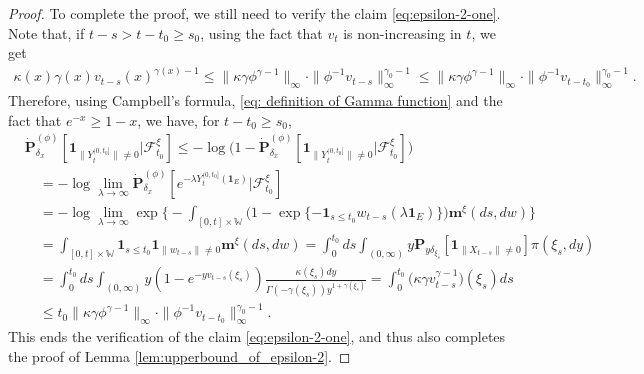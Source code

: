 \documentclass[12pt,a4paper]{amsart}
\theoremstyle{definition}
\numberwithin{equation}{section}
\begin{document}
\begin{proof}
To complete the proof, we still need to verify the claim \eqref{eq:epsilon-2-one}.
Note that, if $t-s > t-t_0 \geq s_0$, using the fact that $v_t$ is non-increasing in $t$, we get
\begin{align}
	\kappa(x)\gamma(x) v_{t-s}(x)^{\gamma(x)-1}
	\leq \|\kappa \gamma \phi^{\gamma - 1}\|_\infty \cdot \|\phi^{-1} v_{t-s}\|^{\gamma_0-1}_\infty
	\leq \|\kappa\gamma\phi^{\gamma - 1}\|_\infty \cdot \|\phi^{-1}v_{t-t_0}\|^{\gamma_0-1}_\infty.
\end{align}
Therefore, using Campbell's formula, \eqref{eq: definition of Gamma function} and the fact that $e^{-x} \geq 1-x$, we have,  for $t-t_0 \geq s_0$,
\begin{align}
	&\dot{\mathbf P}_{\delta_x}^{(\phi)}[\mathbf 1_{\| Y_t^{(0,t_0]}\|\neq 0}|\mathscr F^\xi_{t_0}]
   \leq - \log \big( 1- \dot{\mathbf P}_{\delta_x}^{(\phi)}[\mathbf 1_{ \| Y_t^{(0,t_0]}\|\neq 0}|\mathscr F^\xi_{t_0}]\big)
	\\&\quad =  - \log \lim_{\lambda \to \infty}\dot{\mathbf P}_{\delta_x}^{(\phi)}[e^{- \lambda Y_t^{(0,t_0]}(\mathbf 1_E) }|\mathscr F^\xi_{t_0}]
	\\&\quad = -\log \lim_{\lambda \to \infty} \exp\Big\{- \int_{[0,t]\times \mathbb W} \big( 1-\exp\{- \mathbf 1_{s\leq t_0} w_{t-s}(\lambda \mathbf 1_E)\}  \big) \mathbf m^\xi(ds,dw)\Big\}
	\\&\quad = \int_{[0,t]\times \mathbb W}\mathbf 1_{s\leq t_0} \mathbf 1_{ \|w_{t-s}\| \neq 0} \mathbf m^\xi(ds,dw)
	= \int_0^{t_0} ds \int_{(0,\infty)} y\mathbf P_{y\delta_{\xi_s}}[\mathbf 1_{ \|X_{t-s}\| \neq 0}]\pi(\xi_s,dy)
	\\&\quad= \int_0^{t_0} ds \int_{(0,\infty)} y (1-e^{-yv_{t-s}(\xi_s)})  \frac{\kappa(\xi_s)dy}{\Gamma(-\gamma(\xi_s)) y^{1+\gamma(\xi_s)}}
	= \int_0^{t_0} \big( \kappa \gamma  v_{t-s}^{\gamma - 1} \big) (\xi_s)ds
	\\&\quad \leq  t_0\|\kappa \gamma \phi^{\gamma - 1}\|_\infty \cdot \|\phi^{-1}v_{t-t_0}\|^{\gamma_0-1}_\infty.
\end{align}
This ends the verification of the claim \eqref{eq:epsilon-2-one}, and thus also completes the proof of Lemma \ref{lem:upperbound_of_epsilon-2}.

\end{proof}
\end{document}
